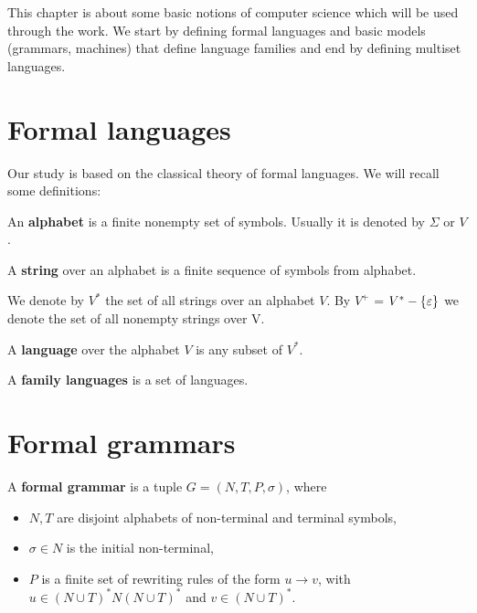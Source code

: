 This chapter is about some basic notions of computer science which will be used through the work. We start by defining formal languages and basic models (grammars, machines) that define language families and end by defining multiset languages.

\section{Formal languages} %
\label{sec:formal_languages}

Our study is based on the classical theory of formal languages. We will recall some definitions:

\begin{definition}
An {\bf alphabet} is a finite nonempty set of symbols. Usually it is denoted by $\Sigma$ or $V$.
\end{definition}

\begin{definition}
A {\bf string} over an alphabet is a finite sequence of symbols from alphabet.
\end{definition}

We denote by $V^*$ the set of all strings over an alphabet $V$. By $V^+$ = $V^* - \{\varepsilon\}$ we denote the set of all nonempty strings over V.

\begin{definition}
A {\bf language} over the alphabet $V$ is any subset of $V^*$.
\end{definition}

\begin{definition}
A {\bf family languages} is a set of languages.
\end{definition}


\section{Formal grammars} %
\label{sec:formal_grammars}

\begin{definition}
A {\bf formal grammar} is a tuple $G = (N,T,P,\sigma)$, where
\begin{itemize}
  \item $N, T$ are disjoint alphabets of non-terminal and terminal symbols,
  \item $\sigma\in N$ is the initial non-terminal,
  \item $P$ is a finite set of rewriting rules of the form $u\rightarrow v$, with $u\in (N\cup T)^*N(N\cup T)^*$ and $v\in (N\cup T)^*$.
\end{itemize}
\end{definition}

